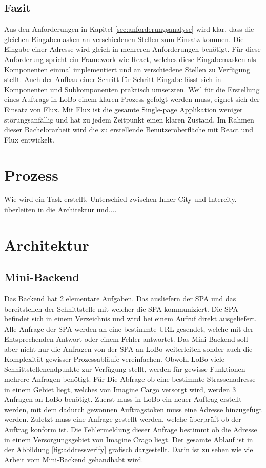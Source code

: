 \subsection{Fazit}
Aus den Anforderungen in Kapitel \ref{sec:anforderungsanalyse} wird klar, dass die gleichen Eingabemasken an verschiedenen Stellen zum Einsatz kommen. Die Eingabe einer Adresse wird gleich in mehreren Anforderungen benötigt. Für diese Anforderung spricht ein Framework wie React, welches diese Eingabemasken als Komponenten einmal implementiert und an verschiedene Stellen zu Verfügung stellt. Auch der Aufbau einer Schritt für Schritt Eingabe lässt sich in Komponenten und Subkomponenten praktisch umsetzten. Weil für die Erstellung eines Auftrags in LoBo einem klaren Prozess gefolgt werden muss, eignet sich der Einsatz von Flux. Mit Flux ist die gesamte Single-page Applikation weniger störungsanfällig und hat zu jedem Zeitpunkt einen klaren Zustand. Im Rahmen dieser Bachelorarbeit wird die zu erstellende Benutzeroberfläche mit React und Flux entwickelt.

\section{Prozess}
Wie wird ein Task erstellt. Unterschied zwischen Inner City und Intercity. überleiten in die Architektur und....


\section{Architektur}

\subsection{Mini-Backend}
Das Backend hat 2 elementare Aufgaben. Das ausliefern der SPA und das bereitstellen der Schnittstelle mit welcher die SPA kommuniziert. Die SPA befindet sich in einem Verzeichnis und wird bei einem Aufruf direkt ausgeliefert. Alle Anfrage der SPA werden an eine bestimmte URL gesendet, welche mit der Entsprechenden Antwort oder einem Fehler antwortet. Das Mini-Backend soll aber nicht nur die Anfragen von der SPA an LoBo weiterleiten sonder auch die Komplexität gewisser Prozessabläufe vereinfachen. Obwohl LoBo viele Schnittstellenendpunkte zur Verfügung stellt, werden für gewisse Funktionen mehrere Anfragen benötigt. Für Die Abfrage ob eine bestimmte Strassenadresse in einem Gebiet liegt, welches von Imagine Cargo versorgt wird, werden 3 Anfragen an LoBo benötigt. Zuerst muss in LoBo ein neuer Auftrag erstellt werden, mit dem dadurch gewonnen Auftragstoken muss eine Adresse hinzugefügt werden. Zuletzt muss eine Anfrage gestellt werden, welche überprüft ob der Auftrag konform ist. Die Fehlermeldung dieser Anfrage bestimmt ob die Adresse in einem Versorgungsgebiet von Imagine Crago liegt. Der gesamte Ablauf ist in der Abbildung \ref{fig:addressverify} grafisch dargestellt. Darin ist zu sehen wie viel Arbeit vom Mini-Backend gehandhabt wird.

